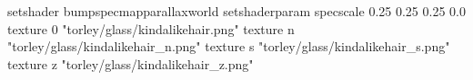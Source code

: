 setshader bumpspecmapparallaxworld
setshaderparam specscale 0.25 0.25 0.25 0.0
texture 0 "torley/glass/kindalikehair.png"
texture n "torley/glass/kindalikehair_n.png"
texture s "torley/glass/kindalikehair_s.png"
texture z "torley/glass/kindalikehair_z.png"

